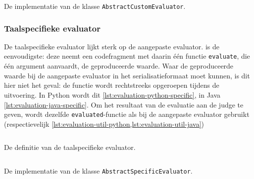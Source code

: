 \begin{listing}
    \inputminted{java}{../../judge/runners/templates/java/AbstractCustomEvaluator.java}
    \caption{De implementatie van de klasse \texttt{AbstractCustomEvaluator}.}
    \label{lst:evaluation-java-custom}
\end{listing}

\subsubsection{Taalspecifieke evaluator}

De taalspecifieke evaluator lijkt sterk op de aangepaste evaluator.
is de eenvoudigste: deze neemt een codefragment met daarin één functie \texttt{evaluate}, die één argument aanvaardt, de geproduceerde waarde.
Waar de geproduceerde waarde bij de aangepaste evaluator in het serialisatieformaat moet kunnen, is dit hier niet het geval: de functie wordt rechtstreeks opgeroepen tijdens de uitvoering.
In Python wordt dit \cref{lst:evaluation-python-specific}, in Java \cref{lst:evaluation-java-specific}.
Om het resultaat van de evaluatie aan de judge te geven, wordt dezelfde \texttt{evaluated}-functie als bij de aangepaste evaluator gebruikt (respectievelijk \cref{lst:evaluation-util-python,lst:evaluation-util-java})

\begin{listing}
    \inputminted{python}{code/specific_signature.py}
    \caption{De definitie van de taalspecifieke evaluator.}
    \label{lst:evaluation-python-specific}
\end{listing}

\begin{listing}
    \inputminted{java}{../../judge/runners/templates/java/AbstractSpecificEvaluator.java}
    \caption{De implementatie van de klasse \texttt{AbstractSpecificEvaluator}.}
    \label{lst:evaluation-java-specific}
\end{listing}
